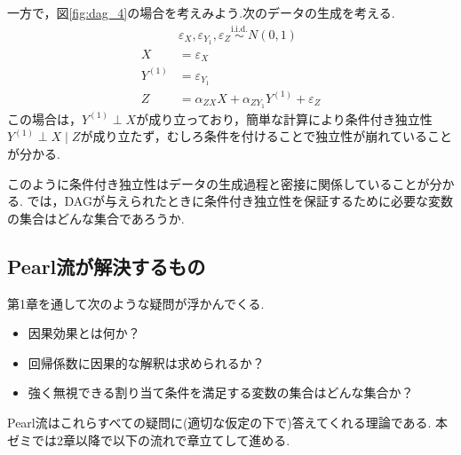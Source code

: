 \documentclass[uplatex, dvipdfmx]{jsarticle}
\begin{document}
一方で，図\ref{fig:dag_4}の場合を考えみよう.次のデータの生成を考える.
\begin{align}
  &\varepsilon_X, \varepsilon_{Y_1}, \varepsilon_Z \overset{\text{i.i.d.}}{\sim} N(0, 1) \\
  X &= \varepsilon_X \\
  Y^{(1)} &= \varepsilon_{Y_1} \\
  Z &= \alpha_{ZX}X + \alpha_{Z{Y_1}}Y^{(1)} + \varepsilon_Z 
\end{align}
この場合は，$Y^{(1)} \perp X$が成り立っており，簡単な計算により条件付き独立性$Y^{(1)} \perp X \mid Z$が成り立たず，むしろ条件を付けることで独立性が崩れていることが分かる.

このように条件付き独立性はデータの生成過程と密接に関係していることが分かる.
では，DAGが与えられたときに条件付き独立性を保証するために必要な変数の集合はどんな集合であろうか.

\newpage

\subsection{Pearl流が解決するもの}
第1章を通して次のような疑問が浮かんでくる.
\begin{itemize}
  \item 因果効果とは何か？
  \item 回帰係数に因果的な解釈は求められるか？
  \item 強く無視できる割り当て条件を満足する変数の集合はどんな集合か？
\end{itemize}
Pearl流はこれらすべての疑問に(適切な仮定の下で)答えてくれる理論である.
本ゼミでは2章以降で以下の流れで章立てして進める.
\end{document}
